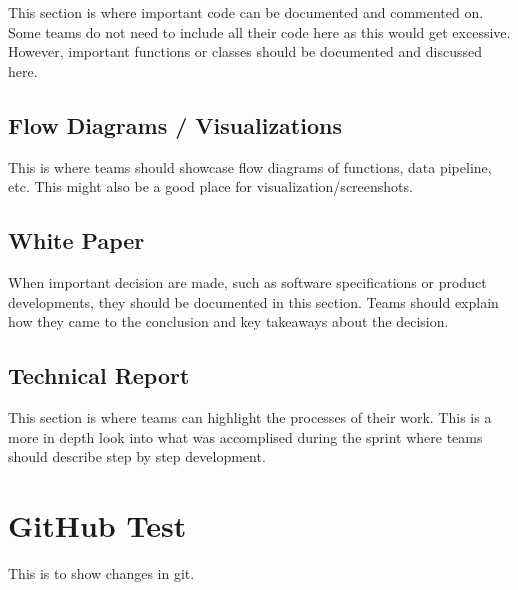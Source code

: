 \documentclass[]{book}
\begin{document}
This section is where important code can be documented and commented on.
Some teams do not need to include all their code here as this would get
excessive. However, important functions or classes should be documented
and discussed here.

\section{Flow Diagrams /
Visualizations}\label{flow-diagrams-visualizations}

This is where teams should showcase flow diagrams of functions, data
pipeline, etc. This might also be a good place for
visualization/screenshots.

\section{White Paper}\label{white-paper}

When important decision are made, such as software specifications or
product developments, they should be documented in this section. Teams
should explain how they came to the conclusion and key takeaways about
the decision.

\section{Technical Report}\label{technical-report}

This section is where teams can highlight the processes of their work.
This is a more in depth look into what was accomplised during the sprint
where teams should describe step by step development.

\chapter{GitHub Test}\label{github-test}

This is to show changes in git.
\end{document}
